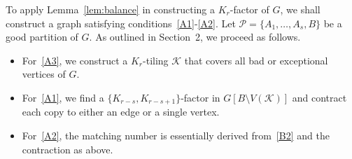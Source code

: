 \documentclass[11pt, a4paper]{article}
\theoremstyle{definition}
\newcommand{\<}{\subseteq}
\begin{document}
To apply Lemma~\ref{lem:balance} in constructing a \(K_r\)-factor of \(G\), 
we shall construct a graph satisfying conditions~\ref{A1}-\ref{A2}. Let $\mathcal{P}=\{A_1,\ldots,A_s,B\}$ be a good partition of $G$. %
As outlined in Section~2, we proceed as follows. 

\begin{itemize}
    \item For~\ref{A3}, we construct a $K_r$-tiling $\mathcal{K}$ that covers all bad or exceptional vertices of $G$.
    \item For~\ref{A1}, we find a $\{K_{r-s},K_{r-s+1}\}$-factor in $G[B\setminus V(\mathcal{K})]$ and contract each copy to either an edge or a single vertex.
    \item For~\ref{A2}, the matching number is essentially derived from~\ref{B2} and the contraction as above.
\end{itemize}


\end{document}
